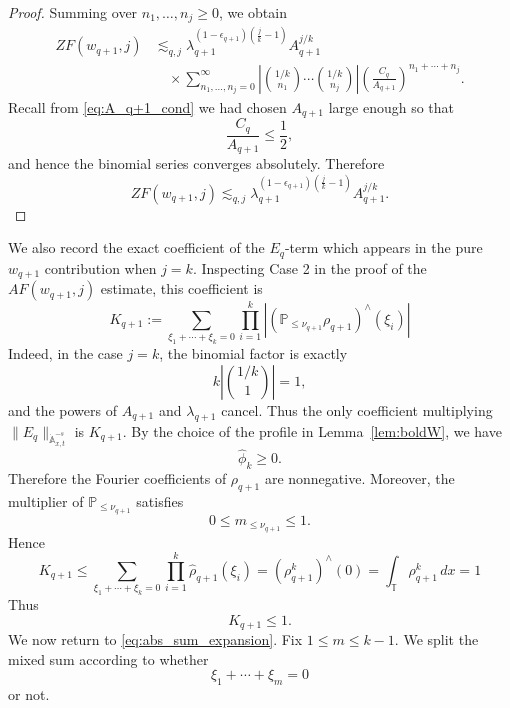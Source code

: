 \documentclass[12pt,reqno,letterpaper]{amsart}
\numberwithin{equation}{section}
\newcommand{\1}{{\bf 1}}
\newcommand{\2}{{\bf 2}}
\newcommand{\T}{\mathbb T}
\theoremstyle{remark}
\theoremstyle{remark}
\begin{document}
\begin{proof}
Summing over $n_1,\ldots,n_j\geq0$, we obtain
\[
\begin{aligned}
ZF(w_{q+1},j)
&\lesssim_{q,j}
\lambda_{q+1}^{(1-\epsilon_{q+1})(\frac jk-1)}
A_{q+1}^{j/k}
\\
&\quad\times
\sum_{n_1,\ldots,n_j=0}^{\infty}
\left|
\binom{1/k}{n_1}\cdots\binom{1/k}{n_j}
\right|
\left(\frac{C_q}{A_{q+1}}\right)^{n_1+\cdots+n_j}.
\end{aligned}
\]
Recall from \eqref{eq:A_q+1_cond} we had chosen $A_{q+1}$ large enough so that
\[
    \frac{C_q}{A_{q+1}}\leq \frac12,
\]
and hence the binomial series converges absolutely. Therefore
\[
ZF(w_{q+1},j)
\lesssim_{q,j}
\lambda_{q+1}^{(1-\epsilon_{q+1})(\frac jk-1)}
A_{q+1}^{j/k}.
\]
\end{proof}
We also record the exact coefficient of the $E_q$-term which appears in the pure $w_{q+1}$ contribution when $j=k$. Inspecting Case 2 in the proof of the $AF(w_{q+1},j)$ estimate, this coefficient is 
\begin{equation}\label{eq:E-coeff-pure-w}
K_{q+1} := \sum_{\xi_1+\cdots+\xi_k=0} \prod_{i=1}^k \left| (\mathbb P_{\le \nu_{q+1}}\rho_{q+1})^{\wedge}(\xi_i)\right|    
\end{equation}
Indeed, in the case $j=k$, the binomial factor is exactly
\[
k\left|\binom{1/k}{1}\right|=1,
\]
and the powers of $A_{q+1}$ and $\lambda_{q+1}$ cancel. Thus the only coefficient multiplying $\|E_q\|_{\dot{\mathbb{A}}_{x,t}^{-s}}$ is $K_{q+1}$. By the choice of the profile in Lemma~\ref{lem:boldW}, we have
\[
\hat{\phi}_k\ge0.
\]
Therefore the Fourier coefficients of $\rho_{q+1}$ are nonnegative. Moreover, the multiplier of $\mathbb P_{\le\nu_{q+1}}$ satisfies
\[
0\le m_{\le\nu_{q+1}}\le1.
\]
Hence
\[
    K_{q+1} \le \sum_{\xi_1+\cdots+\xi_k=0}\prod_{i=1}^k \hat{\rho}_{q+1}(\xi_i) = \left(\rho_{q+1}^k\right)^{\wedge}(0) = \int_\T \rho_{q+1}^k\,dx =1
\]
Thus
\begin{equation}\label{eq:E-coeff-bound}
    K_{q+1} \le 1.
\end{equation}
We now return to \eqref{eq:abs_sum_expansion}. Fix $1\leq m\leq k-1$. We split the mixed sum according to whether
\[
    \xi_1+\cdots+\xi_m=0
\]
or not.
\end{document}

